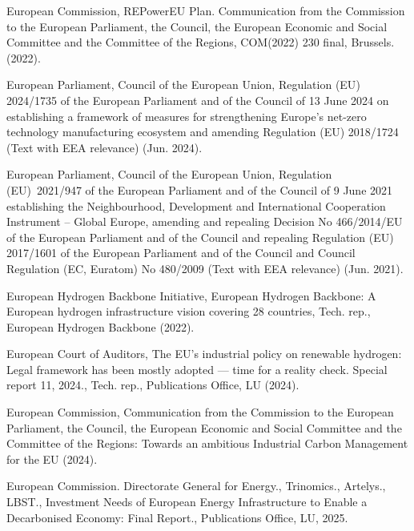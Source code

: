 \documentclass[preprint,12pt,sort&compress]{elsarticle}
\begin{document}
\begin{thebibliography}{10}
{European Commission}, {{REPowerEU Plan}}. {{Communication}} from the {{Commission}} to the {{European Parliament}}, the {{Council}}, the {{European Economic}} and {{Social Committee}} and the {{Committee}} of the {{Regions}}, {{COM}}(2022) 230 final, {{Brussels}}. (2022).

{European Parliament}, {Council of the European Union}, Regulation ({{EU}}) 2024/1735 of the {{European Parliament}} and of the {{Council}} of 13 {{June}} 2024 on establishing a framework of measures for strengthening {{Europe}}'s net-zero technology manufacturing ecosystem and amending {{Regulation}} ({{EU}}) 2018/1724 ({{Text}} with {{EEA}} relevance) (Jun. 2024).

{European Parliament}, {Council of the European Union}, Regulation ({{EU}})~2021/947 of the {{European Parliament}} and of the {{Council}} of 9 {{June}} 2021 establishing the {{Neighbourhood}}, {{Development}} and {{International Cooperation Instrument}} -- {{Global Europe}}, amending and repealing {{Decision No}} 466/2014/{{EU}} of the {{European Parliament}} and of the {{Council}} and repealing {{Regulation}} ({{EU}}) 2017/1601 of the {{European Parliament}} and of the {{Council}} and {{Council Regulation}} ({{EC}}, {{Euratom}}) {{No}} 480/2009 ({{Text}} with {{EEA}} relevance) (Jun. 2021).

{European Hydrogen Backbone Initiative}, European {{Hydrogen Backbone}}: {{A European}} hydrogen infrastructure vision covering 28 countries, Tech. rep., European Hydrogen Backbone (2022).

{European Court of Auditors}, The {{EU}}'s industrial policy on renewable hydrogen: {{Legal}} framework has been mostly adopted --- time for a reality check. {{Special}} report 11, 2024., Tech. rep., Publications Office, LU (2024).

{European Commission}, Communication from the {{Commission}} to the {{European Parliament}}, the {{Council}}, the {{European Economic}} and {{Social Committee}} and the {{Committee}} of the {{Regions}}: {{Towards}} an ambitious {{Industrial Carbon Management}} for the {{EU}} (2024).

{European Commission. Directorate General for Energy.}, {Trinomics.}, {Artelys.}, {LBST.}, Investment Needs of {{European}} Energy Infrastructure to Enable a Decarbonised Economy: Final Report., Publications Office, LU, 2025.


\end{thebibliography}
\end{document}

